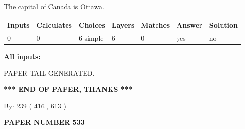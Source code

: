 \documentclass[12pt]{article}
\begin{document}
 
The capital of Canada is Ottawa.
 
 
\noindent{}
 
 
   
   
   
   
\noindent\begin{tabular}{|l|l|l|l|l|l|l|}
 \hline
Inputs & Calculates & Choices & Layers & Matches & Answer & Solution \\ \hline
 0  & 
 0  & 
 6
  simple  
  & 
 6  & 
 0  & 
  yes & 
  no 
  \\ \hline
 \end{tabular}
   
   
   
   
\noindent{}
   
   
   
   
\noindent\vspace{0.1in}\hspace{-0.08in} {\textbf{\Large{All inputs: }}}
   
   
   
   
   
   
 \vspace{0.2in}
 
   
   
\vspace{2.0in} PAPER TAIL GENERATED.
   
   
   
   
\vspace{1.0in} 
{\textbf{\large{ *** END OF PAPER, THANKS *** }}} 
   
   
\hspace{1.0in} By: 
 239 ( 416 ,  613 )
   
   
   
   
\newpage 
\setcounter{page}{ 
   533001 } 
   
   
   
   
 {\textbf{ \Large{ PAPER NUMBER  533  }}}
   
   
\vspace{0.2in}
   
   
   
   
   
   
   
\end{document}
